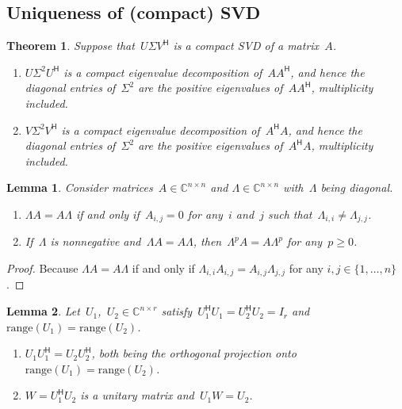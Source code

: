 \documentclass[11pt,a4paper]{article}  %
\numberwithin{equation}{section}
\newtheorem{theorem}{Theorem}%
\newtheorem{lemma}{Lemma}%
\theoremstyle{definition}
\def\CC{\mathbb{C}}
\newcommand{\hmt}{{\scriptscriptstyle{{\mathsf{H}}}}}
\newcommand{\range}{\mathrm{range}}
\begin{document}
\subsection{Uniqueness of (compact) SVD}

\begin{theorem}
 Suppose that~$U\Sigma V^\hmt$ is a compact SVD of a matrix~$A$.
 \begin{enumerate}[leftmargin=1.5em]
   \item $U\Sigma^2 U^\hmt$ is a compact eigenvalue decomposition of~$AA^\hmt$,
     and hence the diagonal entries of~$\Sigma^2$ are the positive eigenvalues of~$AA^\hmt$, multiplicity included.
   \item $V\Sigma^2 V^\hmt$ is a compact eigenvalue decomposition of~$A^\hmt A$,
     and hence the diagonal entries of~$\Sigma^2$ are the positive eigenvalues of~$A^\hmt A$, multiplicity included.
 \end{enumerate}
\end{theorem}

\begin{lemma}
  \label{lem:commute}
  Consider matrices~$A \in \CC^{n\times n}$ and $\Lambda \in \CC^{n\times n}$ with~$\Lambda$ being diagonal.
  \begin{enumerate}[leftmargin=1.5em]
  \item $\Lambda A = A\Lambda$ if and only if~$A_{i,j} = 0$ for any~$i$ and~$j$ such that~$\Lambda_{i,i}\neq \Lambda_{j,j}$.
  \item If~$\Lambda$ is nonnegative and~$\Lambda A = A\Lambda$, then~$\Lambda^p A = A \Lambda^p$ for
    any~$p\ge 0$.
  \end{enumerate}
\end{lemma}

\begin{proof} Because
$\Lambda A = A \Lambda$ if and only if
$\Lambda_{i,i} A_{i,j} = A_{i,j} \Lambda_{j,j}$ for any $i,j\in\{1, \dots, n\}$.
\end{proof}

\begin{lemma}
  \label{lem:unitary}
  Let~$U_1$,~$U_2 \in \CC^{n\times r}$ satisfy~$U_1^\hmt U_1 = U_2^\hmt U_2
  = I_r$ and~$\range(U_1) = \range(U_2)$.
  \begin{enumerate}[leftmargin=1.5em]
    \item $U_1U_1^\hmt = U_2U_2^\hmt$, both being the orthogonal projection onto~$\range(U_1)
      = \range(U_2)$.
    \item $W=U_1^\hmt U_2$ is a unitary matrix and~$U_1W = U_2$.
  \end{enumerate}
\end{lemma}
\end{document}
